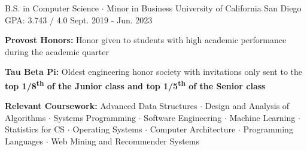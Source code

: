 

\begin{cventries}

  \cventry
    {B.S. in Computer Science $\cdot$ Minor in Business} %
    {University of California San Diego} %
    {GPA: 3.743 / 4.0} %
    {Sept. 2019 - Jun. 2023} %
    {
      \begin{cvitems} %
        \item {\textbf{Provost Honors:} Honor given to students with high academic performance during the academic quarter}
        \item {\textbf{Tau Beta Pi:} Oldest engineering honor society with invitations only sent to the \textbf{top 1/8\textsuperscript{th} of the Junior class and top 1/5\textsuperscript{th} of the Senior class}}
        \item {\textbf{Relevant Coursework:} Advanced Data Structures $\cdot$ Design and Analysis of Algorithms $\cdot$ Systems Programming $\cdot$ Software Engineering $\cdot$ Machine Learning $\cdot$ Statistics for CS $\cdot$ Operating Systems $\cdot$ Computer Architecture $\cdot$ Programming Languages $\cdot$ Web Mining and Recommender Systems}
      \end{cvitems}
    }

\end{cventries}
